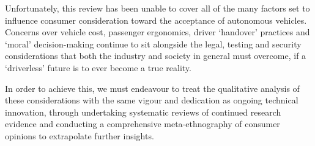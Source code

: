 \documentclass[conference]{IEEEtran}
\begin{document}
Unfortunately, this review has been unable to cover all of the many factors set to influence consumer consideration toward the acceptance of autonomous vehicles. Concerns over vehicle cost, passenger ergonomics, driver `handover' practices and `moral' decision-making continue to sit alongside the legal, testing and security considerations that both the industry and society in general must overcome, if a `driverless' future is to ever become a true reality. 

In order to achieve this, we must endeavour to treat the qualitative analysis of these considerations with the same vigour and dedication as ongoing technical innovation, through undertaking systematic reviews of continued research evidence and conducting a comprehensive meta-ethnography \cite{noblit} of consumer opinions to extrapolate further insights.

%
%




%
%
%
%



\begingroup
\raggedright


\endgroup


\end{document}

